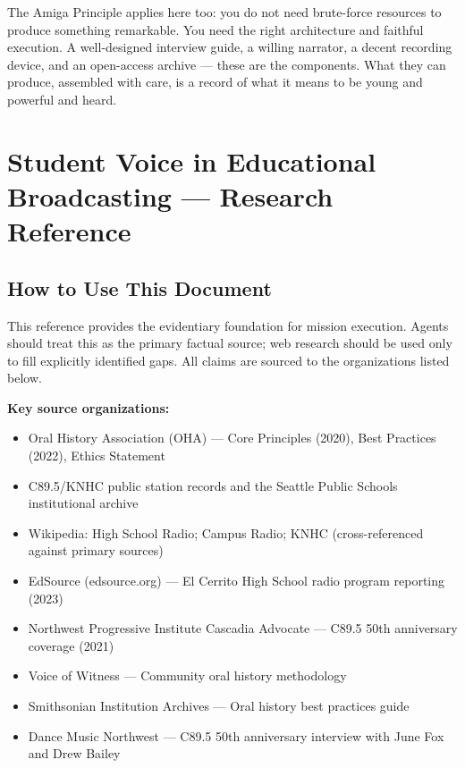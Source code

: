 \documentclass[11pt,letterpaper]{article}
\newcommand{\stageheader}[2]{%
  \noindent\colorbox{#2}{\makebox[\textwidth][l]{%
    \textcolor{white}{\bfseries\sffamily\hspace{6pt}#1\hspace{6pt}}}}%
  \vspace{0.5em}\par%
}
\begin{document}
The Amiga Principle applies here too: you do not need brute-force resources to produce something remarkable. You need the right architecture and faithful execution. A well-designed interview guide, a willing narrator, a decent recording device, and an open-access archive --- these are the components. What they can produce, assembled with care, is a record of what it means to be young and powerful and heard.

\newpage

\stageheader{STAGE 2 --- RESEARCH REFERENCE}{secondary}

\section{Student Voice in Educational Broadcasting --- Research Reference}

\subsection{How to Use This Document}

This reference provides the evidentiary foundation for mission execution. Agents should treat this as the primary factual source; web research should be used only to fill explicitly identified gaps. All claims are sourced to the organizations listed below.

\textbf{Key source organizations:}
\begin{itemize}
  \item Oral History Association (OHA) --- Core Principles (2020), Best Practices (2022), Ethics Statement
  \item C89.5/KNHC public station records and the Seattle Public Schools institutional archive
  \item Wikipedia: High School Radio; Campus Radio; KNHC (cross-referenced against primary sources)
  \item EdSource (edsource.org) --- El Cerrito High School radio program reporting (2023)
  \item Northwest Progressive Institute Cascadia Advocate --- C89.5 50th anniversary coverage (2021)
  \item Voice of Witness --- Community oral history methodology
  \item Smithsonian Institution Archives --- Oral history best practices guide
  \item Dance Music Northwest --- C89.5 50th anniversary interview with June Fox and Drew Bailey
\end{itemize}
\end{document}
